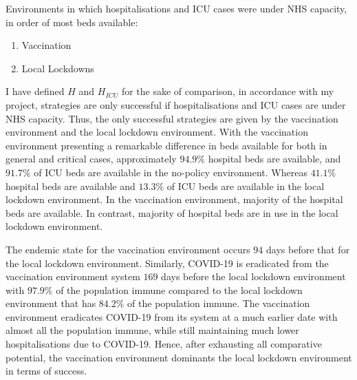 \documentclass[11pt]{article}
\begin{document}
Environments in which hospitalisations and ICU cases were under NHS capacity, in order of most beds available:
\begin{enumerate}
\item Vaccination
\item Local Lockdowns
\end{enumerate}
I have defined $H$ and $H_{ICU}$ for the sake of comparison, in accordance with my project, strategies are only successful if hospitalisations and ICU cases are under NHS capacity. Thus, the only successful strategies are given by the vaccination environment and the local lockdown environment. With the vaccination environment presenting a remarkable difference in beds available for both in general and critical cases, approximately $94.9\%$ hospital beds are available, and $91.7\%$ of ICU beds are available in the no-policy environment. Whereas $41.1\%$ hospital beds are available and $13.3\%$ of ICU beds are available in the local lockdown environment. In the vaccination environment, majority of the hospital beds are available. In contrast, majority of hospital beds are in use in the local lockdown environment. \par
The endemic state for the vaccination environment occurs $ 94$ days before that for the local lockdown environment. Similarly, COVID-19 is eradicated from the vaccination environment system $ 169$ days before the local lockdown environment with $97.9\%$ of the population immune compared to the local lockdown environment that has $84.2\%$ of the population immune. The vaccination environment eradicates COVID-19 from its system at a much earlier date with almost all the population immune, while still maintaining much lower hospitalisations due to COVID-19. Hence, after exhausting all comparative potential, the vaccination environment dominants the local lockdown environment in terms of success.
\end{document}
